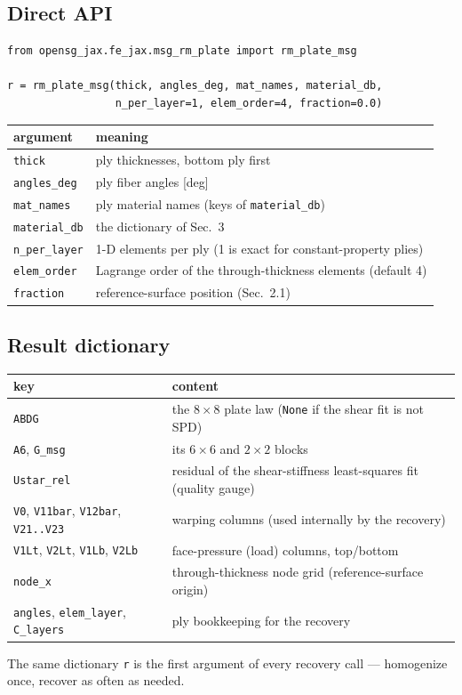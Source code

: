 \documentclass[11pt]{article}
\newcommand{\code}[1]{\texttt{#1}}
\begin{document}
\subsection{Direct API}
\begin{verbatim}
from opensg_jax.fe_jax.msg_rm_plate import rm_plate_msg

r = rm_plate_msg(thick, angles_deg, mat_names, material_db,
                 n_per_layer=1, elem_order=4, fraction=0.0)
\end{verbatim}
\begin{center}
\begin{tabular}{lp{10.2cm}}
\toprule
argument & meaning \\
\midrule
\code{thick} & ply thicknesses, bottom ply first \\
\code{angles\_deg} & ply fiber angles [deg] \\
\code{mat\_names} & ply material names (keys of \code{material\_db}) \\
\code{material\_db} & the dictionary of Sec.~3 \\
\code{n\_per\_layer} & 1-D elements per ply (1 is exact for constant-property plies) \\
\code{elem\_order} & Lagrange order of the through-thickness elements (default 4) \\
\code{fraction} & reference-surface position (Sec.~2.1) \\
\bottomrule
\end{tabular}
\end{center}

\subsection{Result dictionary}
\begin{center}
\begin{tabular}{lp{9.6cm}}
\toprule
key & content \\
\midrule
\code{ABDG} & the $8\times8$ plate law (\code{None} if the shear fit is not SPD) \\
\code{A6}, \code{G\_msg} & its $6\times6$ and $2\times2$ blocks \\
\code{Ustar\_rel} & residual of the shear-stiffness least-squares fit (quality gauge) \\
\code{V0}, \code{V11bar}, \code{V12bar}, \code{V21..V23} & warping columns (used internally by the recovery) \\
\code{V1Lt}, \code{V2Lt}, \code{V1Lb}, \code{V2Lb} & face-pressure (load) columns, top/bottom \\
\code{node\_x} & through-thickness node grid (reference-surface origin) \\
\code{angles}, \code{elem\_layer}, \code{C\_layers} & ply bookkeeping for the recovery \\
\bottomrule
\end{tabular}
\end{center}
The same dictionary \code{r} is the first argument of every recovery
call --- homogenize once, recover as often as needed.
\end{document}
